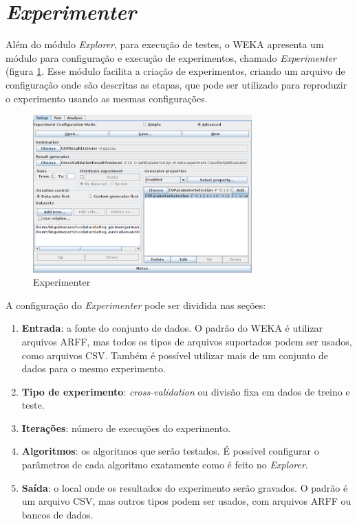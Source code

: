 \section{\emph{Experimenter}}

Além do módulo \emph{Explorer}, para execução de testes, o WEKA apresenta um módulo para configuração e execução de experimentos, chamado \emph{Experimenter} (figura \ref{fig:dev_weka_experimenter}. Esse módulo facilita a criação de experimentos, criando um arquivo de configuração onde são descritas as etapas, que pode ser utilizado para reproduzir o experimento usando as mesmas configurações.

\begin{figure}[h!]
\vspace{0.5cm}
    \centering
    \caption{Experimenter}
    \label{fig:dev_weka_experimenter}
    \vspace{0.5cm}
    \includegraphics[width=0.75\textwidth]{img/experimenter.png}
    \vspace{0.5cm}
\vspace{0.5cm}
\end{figure}

A configuração do \emph{Experimenter} pode ser dividida nas seções:

\begin{enumerate}
    \item \textbf{Entrada}: a fonte do conjunto de dados. O padrão do WEKA é utilizar arquivos ARFF, mas todos os tipos de arquivos suportados podem ser usados, como arquivos CSV. Também é possível utilizar mais de um conjunto de dados para o mesmo experimento.
    \item \textbf{Tipo de experimento}: \emph{cross-validation} ou divisão fixa em dados de treino e teste.
    \item \textbf{Iterações}: número de execuções do experimento.
    \item \textbf{Algoritmos}: os algoritmos que serão testados. É possível configurar o parâmetros de cada algoritmo exatamente como é feito no \emph{Explorer}.
    \item \textbf{Saída}: o local onde os resultados do experimento serão gravados. O padrão é um arquivo CSV, mas outros tipos podem ser usados, com arquivos ARFF ou bancos de dados.
\end{enumerate}

